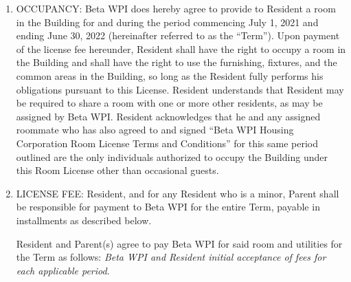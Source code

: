 \documentclass[legalpaper, 12pt]{article}
\begin{document}
\begin{enumerate} 

        
\item\label{itm:occupancy}

OCCUPANCY\@:  Beta WPI does hereby agree to   provide to Resident a room in the Building for and during the period commencing July 1, 2021 and ending June 30, 2022 (hereinafter referred to as the “Term”).
Upon payment of the license fee hereunder, Resident shall have the right to occupy a room in the Building and shall have the right to use the furnishing, fixtures, and the common areas in the Building, so long as the Resident fully performs his obligations pursuant to this License.
Resident understands that Resident may be required to share a room with one or more other residents, as may be assigned by Beta WPI\@.
Resident acknowledges that he and any assigned roommate who has also agreed to and signed “Beta WPI Housing Corporation Room License Terms and Conditions” for this same period outlined are the only individuals authorized to occupy the Building under this Room License other than occasional guests.

\item\label{itm:licensefee}

LICENSE FEE\@: Resident, and for any Resident who is a minor, Parent shall be responsible for payment to Beta WPI for the entire Term, payable in installments as described below.

Resident and Parent(s) agree to pay Beta WPI for said room and utilities for the Term as follows:
\textit{Beta WPI and Resident initial acceptance of fees for each applicable period}.


\end{enumerate}
\end{document}

